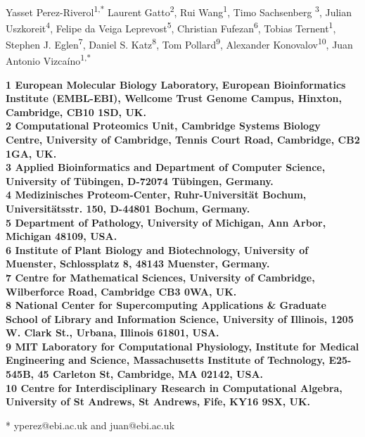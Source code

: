 \documentclass[10pt,letterpaper]{article}
\date{}
\begin{document}
\vspace*{0.35in}

\begin{flushleft}
{\Large
\textbf{}
}
\newline
\\

Yasset Perez-Riverol\textsuperscript{1,*}
Laurent Gatto\textsuperscript{2},
Rui Wang\textsuperscript{1}, 
Timo Sachsenberg \textsuperscript{3},
Julian Uszkoreit\textsuperscript{4},
Felipe da Veiga Leprevost\textsuperscript{5},
Christian Fufezan\textsuperscript{6},
Tobias Ternent\textsuperscript{1},
Stephen J. Eglen\textsuperscript{7}, 
Daniel S. Katz\textsuperscript{8}, 
Tom Pollard\textsuperscript{9}, 
Alexander Konovalov\textsuperscript{10},
Juan Antonio Vizcaíno\textsuperscript{1,*}


\bigskip

\bf{1} European Molecular Biology Laboratory, European Bioinformatics
Institute (EMBL-EBI), Wellcome Trust Genome Campus, Hinxton,
Cambridge, CB10 1SD, UK.
\\
\bf{2} Computational Proteomics Unit, Cambridge Systems Biology
Centre, University of Cambridge, Tennis Court Road, Cambridge, CB2
1GA, UK.
\\
\bf{3} Applied Bioinformatics and Department of Computer Science,
University of Tübingen, D-72074 Tübingen, Germany.
\\
\bf{4} Medizinisches Proteom-Center, Ruhr-Universität Bochum,
Universitätsstr. 150, D-44801 Bochum, Germany.
\\
\bf{5} Department of Pathology, University of Michigan, Ann Arbor,
Michigan 48109, USA.
\\
\bf{6} Institute of Plant Biology and Biotechnology, University of
Muenster, Schlossplatz 8, 48143 Muenster, Germany.
\\
\bf{7} Centre for Mathematical Sciences, University of Cambridge,
Wilberforce Road, Cambridge CB3 0WA, UK.
\\
\bf{8} National Center for Supercomputing Applications \&
Graduate School of Library and Information Science, University of
Illinois, 1205 W. Clark St., Urbana, Illinois 61801, USA.
\\
\bf{9} MIT Laboratory for Computational Physiology, Institute for
Medical Engineering and Science, Massachusetts Institute of
Technology, E25-545B, 45 Carleton St, Cambridge, MA 02142, USA.
\\
\bf{10} Centre for Interdisciplinary Research in Computational
Algebra, University of St Andrews, St Andrews, Fife, KY16 9SX, UK.
\bigskip

* yperez@ebi.ac.uk and juan@ebi.ac.uk

\end{flushleft}
\end{document}
